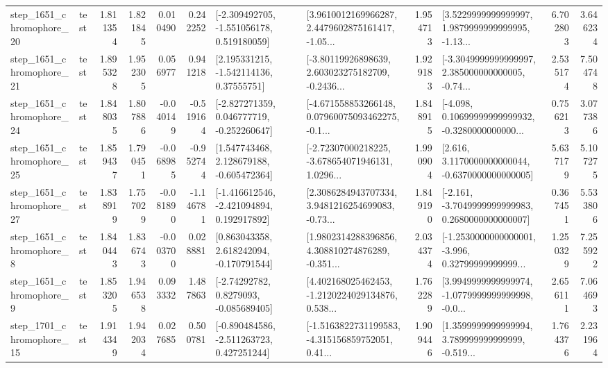 \begin{tabular}{llrrrrllrlrr}
 step\_1651\_chromophore\_20 &      test &      1.811354 &    1.821845 &      0.010490 &  0.242252 &   [-2.309492705, -1.551056178, 0.519180059] &  [3.9610012169966287, 2.4479602875161417, -1.05... &       1.954713 &  [3.5229999999999997, 1.9879999999999995, -1.13... &            6.702803 &          3.646234 \\
 step\_1651\_chromophore\_21 &      test &      1.895328 &    1.952305 &      0.056977 &  0.941218 &     [2.195331215, -1.542114136, 0.37555751] &  [-3.80119926898639, 2.603023275182709, -0.2436... &       1.929183 &  [-3.3049999999999997, 2.385000000000005, -0.74... &            2.535174 &          7.504748 \\
 step\_1651\_chromophore\_24 &      test &      1.848035 &    1.807886 &     -0.040149 & -0.519164 &   [-2.827271359, 0.046777719, -0.252260647] &  [-4.671558853266148, 0.07960075093462275, -0.1... &       1.848915 &  [-4.098, 0.10699999999999932, -0.3280000000000... &            0.756213 &          3.077386 \\
 step\_1651\_chromophore\_25 &      test &      1.859437 &    1.790451 &     -0.068985 & -0.952744 &    [1.547743468, 2.128679188, -0.605472364] &  [-2.72307000218225, -3.678654071946131, 1.0296... &       1.990904 &   [2.616, 3.1170000000000044, -0.6370000000000005] &            5.637179 &          5.107275 \\
 step\_1651\_chromophore\_27 &      test &      1.838919 &    1.757029 &     -0.081890 & -1.146781 &   [-1.416612546, -2.421094894, 0.192917892] &  [2.3086284943707334, 3.9481216254699083, -0.73... &       1.849190 &  [-2.161, -3.7049999999999983, 0.2680000000000007] &            0.367451 &          5.533806 \\
  step\_1651\_chromophore\_8 &      test &      1.840443 &    1.836743 &     -0.003700 &  0.028881 &    [0.863043358, 2.618242094, -0.170791544] &  [1.9802314288396856, 4.308810274876289, -0.351... &       2.034374 &  [-1.2530000000000001, -3.996, 0.32799999999999... &            1.250329 &          7.255922 \\
  step\_1651\_chromophore\_9 &      test &      1.853205 &    1.946538 &      0.093332 &  1.487863 &      [-2.74292782, 0.8279093, -0.085689405] &  [4.402168025462453, -1.2120224029134876, 0.538... &       1.762289 &  [3.9949999999999974, -1.0779999999999998, -0.0... &            2.656111 &          7.064693 \\
 step\_1701\_chromophore\_15 &      test &      1.914349 &    1.942034 &      0.027685 &  0.500781 &   [-0.890484586, -2.511263723, 0.427251244] &  [-1.5163822731199583, -4.315156859752051, 0.41... &       1.909446 &  [1.3599999999999994, 3.789999999999999, -0.519... &            1.764376 &          2.231964 \\

\end{tabular}
